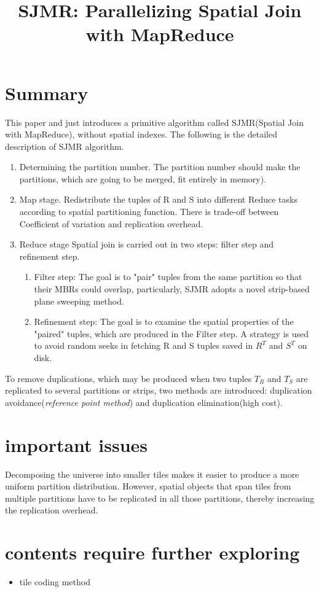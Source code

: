\documentclass[conference]{IEEEtran}
\begin{document}
	
	\title{SJMR: Parallelizing Spatial Join with MapReduce}	
	\maketitle
	\IEEEpeerreviewmaketitle	
	\section{Summary}
	This paper and just introduces a primitive algorithm called SJMR(Spatial Join with MapReduce), without spatial indexes. The following is the detailed description of SJMR algorithm.
	\begin{enumerate}
		\item Determining the partition number. The partition number should make the partitions, which are going to be merged, fit entirely in memory).
		\item Map stage. Redistribute the tuples of R and S into different Reduce tasks according to spatial partitioning function. There is trade-off between Coefficient of variation and replication overhead.
		\item Reduce stage Spatial join is carried out in two steps: filter step and refinement step.
		\begin{enumerate}
			\item Filter step: The goal is to "pair" tuples from the same partition so that their MBRs could overlap, particularly, SJMR adopts a novel strip-based plane sweeping method.
			\item Refinement step: The goal is to examine the spatial properties of the "paired" tuples, which are produced in the Filter step. A strategy is used to avoid random seeks in fetching R and S tuples saved in $R^T$ and $S^T$ on disk.
		\end{enumerate}
	\end{enumerate}
	
	To remove duplications, which may be produced when two tuples $T_R$ and $T_S$ are replicated to several partitions or strips, two methods are introduced: duplication avoidance(\emph{reference point method}) and duplication elimination(high cost). 
	\section{important issues}
	Decomposing the universe into smaller tiles makes it easier
	to produce a more uniform partition distribution. However,
	spatial objects that span tiles from multiple partitions have
	to be replicated in all those partitions, thereby increasing the replication overhead.
	\section{contents require further exploring}
	\begin{itemize}
		\item tile coding method
	\end{itemize}
\end{document}
